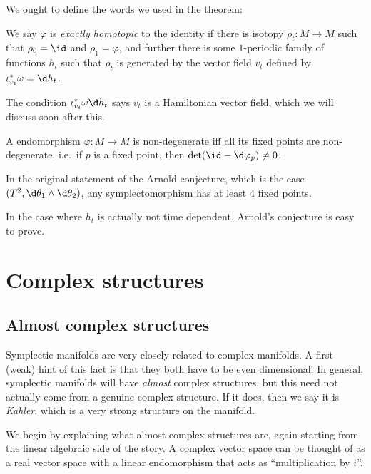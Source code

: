 \documentclass[a4paper]{article}
\begin{document}
We ought to define the words we used in the theorem:

\begin{defi}
  We say $\varphi$ is \emph{exactly homotopic} to the identity if there is isotopy $\rho_t: M \to M$ such that $\rho_0 = \id$ and $\rho_1 = \varphi$, and further there is some $1$-periodic family of functions $h_t$ such that $\rho_t$ is generated by the vector field $v_t$ defined by $\iota_{v_t}^* \omega = \d h_t$.
\end{defi}
The condition $\iota_{v_t}^* \omega \d h_t$ says $v_t$ is a Hamiltonian vector field, which we will discuss soon after this.

\begin{defi}
  A endomorphism $\varphi: M \to M$ is non-degenerate iff all its fixed points are non-degenerate, i.e.\ if $p$ is a fixed point, then $\det (\id - \d \varphi_p) \not= 0$.
\end{defi}
\begin{eg}
  In the original statement of the Arnold conjecture, which is the case $(T^2, \d \theta_1 \wedge \d \theta_2)$, any symplectomorphism has at least $4$ fixed points.
\end{eg}

In the case where $h_t$ is actually not time dependent, Arnold's conjecture is easy to prove.

\section{Complex structures}
\subsection{Almost complex structures}
Symplectic manifolds are very closely related to complex manifolds. A first (weak) hint of this fact is that they both have to be even dimensional! In general, symplectic manifolds will have \emph{almost} complex structures, but this need not actually come from a genuine complex structure. If it does, then we say it is \emph{K\"ahler}, which is a very strong structure on the manifold.

We begin by explaining what almost complex structures are, again starting from the linear algebraic side of the story. A complex vector space can be thought of as a real vector space with a linear endomorphism that acts as ``multiplication by $i$''.
\end{document}
